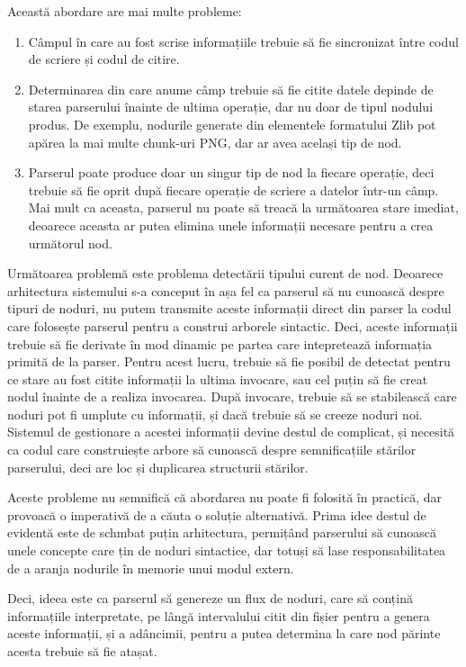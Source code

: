 \documentclass[a4paper,12pt]{report}
\begin{document}
Această abordare are mai multe probleme:
\begin{enumerate}
    \item
        Câmpul în care au fost scrise informațiile trebuie să fie sincronizat
        între codul de scriere și codul de citire.
    \item
        Determinarea din care anume câmp trebuie să fie citite datele
        depinde de starea parserului înainte de ultima operație,
        dar nu doar de tipul nodului produs.
        De exemplu, nodurile generate din elementele formatului Zlib pot apărea
        la mai multe chunk-uri \ac{PNG}, dar ar avea același tip de nod.
    \item
        Parserul poate produce doar un singur tip de nod la fiecare operație, deci trebuie
        să fie oprit după fiecare operație de scriere a datelor într-un câmp.
        Mai mult ca aceasta, parserul nu poate să treacă la următoarea stare imediat,
        deoarece aceasta ar putea elimina unele informații necesare pentru a crea următorul nod.
\end{enumerate}

Următoarea problemă este problema detectării tipului curent de nod.
Deoarece arhitectura sistemului s-a conceput în așa fel ca parserul să nu cunoască despre tipuri de noduri,
nu putem transmite aceste informații direct din parser la codul care folosește parserul pentru
a construi arborele sintactic.
Deci, aceste informații trebuie să fie derivate în mod dinamic pe partea
care intepretează informația primită de la parser.
Pentru acest lucru, trebuie să fie posibil de detectat pentru ce stare au fost citite informații
la ultima invocare, sau cel puțin să fie creat nodul înainte de a realiza invocarea.
După invocare, trebuie să se stabilească care noduri pot fi umplute cu informații,
și dacă trebuie să se creeze noduri noi.
Sistemul de gestionare a acestei informații devine destul de complicat,
și necesită ca codul care construiește arbore să cunoască despre semnificațiile stărilor parserului,
deci are loc și duplicarea structurii stărilor.

Aceste probleme nu semnifică că abordarea nu poate fi folosită în practică,
dar provoacă o imperativă de a căuta o soluție alternativă.
Prima idee destul de evidentă este de schmbat puțin arhitectura,
permițând parserului să cunoască unele concepte care țin de noduri sintactice,
dar totuși să lase responsabilitatea de a aranja nodurile în memorie unui modul extern.

Deci, ideea este ca parserul să genereze un flux de noduri,
care să conțină informațiile interpretate,
pe lângă intervalului citit din fișier pentru a genera aceste informații,
și a adâncimii, pentru a putea determina la care nod părinte acesta trebuie să fie atașat.
\end{document}
